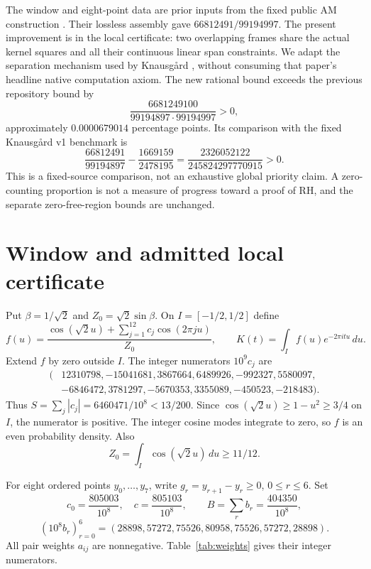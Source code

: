 \documentclass[11pt,a4paper]{article}
\theoremstyle{remark}
\newcommand{\I}{[-1/2,1/2]}
\begin{document}
The window and eight-point data are prior inputs from the fixed
public AM construction \cite{PC8}. Their lossless assembly
\cite{Lossless} gave $66812491/99194997$. The present improvement is
in the local certificate: two overlapping frames share the actual kernel
squares and all their continuous linear span constraints. We adapt the
separation mechanism used by Knausg{\aa}rd \cite[Section~5]{Knaus},
without consuming that paper's headline native computation axiom.
The new rational bound exceeds the previous repository bound by
\[
 \frac{6681249100}{99194897\cdot99194997}>0,
\]
approximately $0.0000679014$ percentage points. Its comparison with the
fixed Knausg{\aa}rd v1 benchmark is
\begin{equation}\label{eq:comparison}
 \frac{66812491}{99194897}-\frac{1669159}{2478195}
 =\frac{2326052122}{245824297770915}>0.
\end{equation}
This is a fixed-source comparison, not an exhaustive global priority
claim. A zero-counting proportion is not a measure of progress toward a
proof of RH, and the separate zero-free-region bounds are unchanged.

\section{Window and admitted local certificate}

Put $\beta=1/\sqrt2$ and $Z_0=\sqrt2\sin\beta$.
On $I=\I$ define
\begin{equation}\label{eq:window}
 f(u)=\frac{\cos(\sqrt2u)+\sum_{j=1}^{12}c_j\cos(2\pi ju)}{Z_0},
 \qquad K(t)=\int_I f(u)e^{-2\pi itu}\,du.
\end{equation}
Extend $f$ by zero outside $I$. The integer numerators $10^9c_j$ are
\[
\begin{split}
(&12310798,-15041681,3867664,6489926,-992327,5580097,\\
 &-6846472,3781297,-5670353,3355089,-450523,-218483).
\end{split}
\]
Thus $S=\sum_j|c_j|=6460471/10^8<13/200$.
Since $\cos(\sqrt2u)\ge1-u^2\ge3/4$ on $I$, the numerator
is positive. The integer cosine modes integrate to zero, so
$f$ is an even probability density. Also
\begin{equation}\label{eq:normalization}
 Z_0=\int_I\cos(\sqrt2u)\,du\ge 11/12.
\end{equation}

For eight ordered points $y_0,\ldots,y_7$, write
$g_r=y_{r+1}-y_r\ge0$, $0\le r\le6$. Set
\[
 c_0=\frac{805003}{10^8},\quad c=\frac{805103}{10^8},\qquad B=\sum_rb_r=\frac{404350}{10^8},
\]
\[
 (10^8b_r)_{r=0}^6=(28898,57272,75526,80958,75526,57272,28898).
\]
All pair weights $a_{ij}$ are nonnegative. Table~\ref{tab:weights}
gives their integer numerators.
\end{document}
